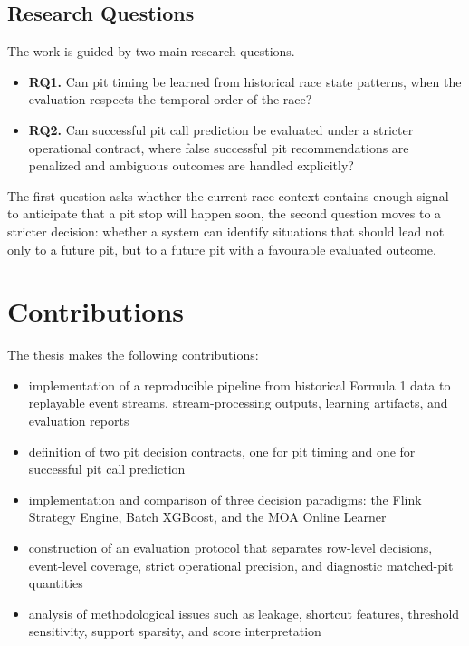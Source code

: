 \subsection{Research Questions}

The work is guided by two main research questions.

\begin{itemize}
    \item \textbf{RQ1.} Can pit timing be learned from historical race state patterns, when the evaluation respects the temporal order of the race?


    \item \textbf{RQ2.} Can successful pit call prediction be evaluated under a stricter operational contract, where false successful pit recommendations are penalized and
          ambiguous outcomes are handled explicitly?


\end{itemize}

The first question asks whether the current race context contains enough signal to anticipate that a pit stop will happen soon, the second question moves to a stricter
decision: whether a system can identify situations that should lead not only to a future pit, but to a future pit with a favourable evaluated outcome.


\section{Contributions}

The thesis makes the following contributions:

\begin{itemize}
    \item implementation of a reproducible pipeline from historical Formula 1 data to replayable event streams, stream-processing outputs, learning artifacts, and evaluation reports


    \item definition of two pit decision contracts, one for pit timing and one for successful pit call prediction

    \item implementation and comparison of three decision paradigms: the Flink Strategy Engine, Batch XGBoost, and the MOA Online Learner

    \item construction of an evaluation protocol that separates row-level decisions, event-level coverage, strict operational precision, and diagnostic matched-pit quantities

    \item analysis of methodological issues such as leakage, shortcut features, threshold sensitivity, support sparsity, and score interpretation


\end{itemize}


